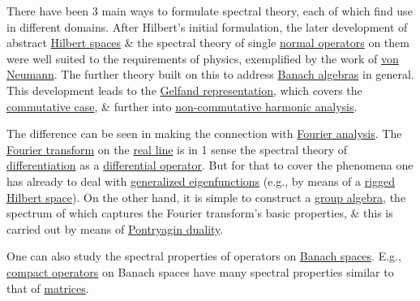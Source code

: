 \documentclass{article}
\begin{document}
There have been 3 main ways to formulate spectral theory, each of which find use in different domains. After {\sc Hilbert}'s initial formulation, the later development of abstract \href{https://en.wikipedia.org/wiki/Hilbert_space}{Hilbert spaces} \& the spectral theory of single \href{https://en.wikipedia.org/wiki/Normal_operator}{normal operators} on them were well suited to the requirements of physics, exemplified by the work of \href{https://en.wikipedia.org/wiki/John_von_Neumann}{\sc von Neumann}. The further theory built on this to address \href{https://en.wikipedia.org/wiki/Banach_algebra}{Banach algebras} in general. This development leads to the \href{https://en.wikipedia.org/wiki/Gelfand_representation}{Gelfand representation}, which covers the \href{https://en.wikipedia.org/wiki/Commutative_Banach_algebra}{commutative case}, \& further into \href{https://en.wikipedia.org/wiki/Non-commutative_harmonic_analysis}{non-commutative harmonic analysis}.

The difference can be seen in making the connection with \href{https://en.wikipedia.org/wiki/Fourier_analysis}{Fourier analysis}. The \href{https://en.wikipedia.org/wiki/Fourier_transform}{Fourier transform} on the \href{https://en.wikipedia.org/wiki/Real_line}{real line} is in 1 sense the spectral theory of \href{https://en.wikipedia.org/wiki/Derivative}{differentiation} as a \href{https://en.wikipedia.org/wiki/Differential_operator}{differential operator}. But for that to cover the phenomena one has already to deal with \href{https://en.wikipedia.org/wiki/Generalized_eigenfunction}{generalized eigenfunctions} (e.g., by means of a \href{https://en.wikipedia.org/wiki/Rigged_Hilbert_space}{rigged Hilbert space}). On the other hand, it is simple to construct a \href{https://en.wikipedia.org/wiki/Group_algebra_of_a_locally_compact_group}{group algebra}, the spectrum of which captures the Fourier transform's basic properties, \& this is carried out by means of \href{https://en.wikipedia.org/wiki/Pontryagin_duality}{Pontryagin duality}.

One can also study the spectral properties of operators on \href{https://en.wikipedia.org/wiki/Banach_spaces}{Banach spaces}. E.g., \href{https://en.wikipedia.org/wiki/Compact_operator}{compact operators} on Banach spaces have many spectral properties similar to that of \href{https://en.wikipedia.org/wiki/Matrix_(mathematics)}{matrices}.
\end{document}
